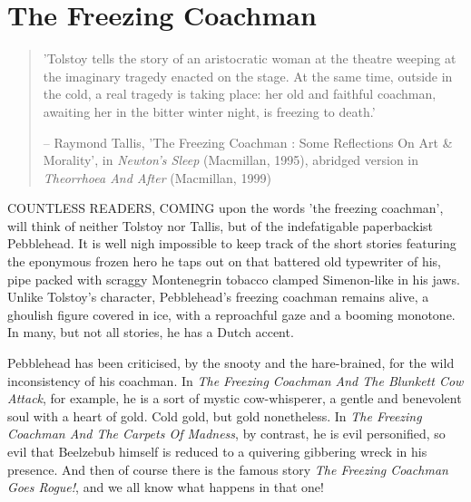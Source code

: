 \chapter{The Freezing Coachman}

\begin{quotation}
'Tolstoy tells the story of an aristocratic woman at the theatre weeping at the imaginary tragedy enacted on the stage. At the same time, outside in the cold, a real tragedy is taking place: her old and faithful coachman, awaiting her in the bitter winter night, is freezing to death.'

-- Raymond Tallis, 'The Freezing Coachman : Some Reflections On Art \& Morality', in \emph{Newton's Sleep} (Macmillan, 1995), abridged version in \emph{Theorrhoea And After} (Macmillan, 1999)
\end{quotation}

COUNTLESS READERS, COMING upon the words 'the freezing coachman', will think of neither Tolstoy nor Tallis, but of the indefatigable paperbackist Pebblehead. It is well nigh impossible to keep track of the short stories featuring the eponymous frozen hero he taps out on that battered old typewriter of his, pipe packed with scraggy Montenegrin tobacco clamped Simenon-like in his jaws. Unlike Tolstoy's character, Pebblehead's freezing coachman remains alive, a ghoulish figure covered in ice, with a reproachful gaze and a booming monotone. In many, but not all stories, he has a Dutch accent.

Pebblehead has been criticised, by the snooty and the hare-brained, for the wild inconsistency of his coachman. In \emph{The Freezing Coachman And The Blunkett Cow Attack}, for example, he is a sort of mystic cow-whisperer, a gentle and benevolent soul with a heart of gold. Cold gold, but gold nonetheless. In \emph{The Freezing Coachman And The Carpets Of Madness}, by contrast, he is evil personified, so evil that Beelzebub himself is reduced to a quivering gibbering wreck in his presence. And then of course there is the famous story \emph{The Freezing Coachman Goes Rogue!}, and we all know what happens in that one!

